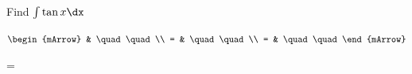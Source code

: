 \clearpage\noindent%
\begin{mtask}
   \task \begin{exercise} Find $\int \tan x \dx$
           \begin{envSolution}
             $\begin{mArrow}
                   & \quad \quad              \\
		   		 = & \quad \quad              \\
				 = & \quad \quad 
              \end{mArrow}$
            \begin{shortsolution}  
			     =$ \quad \quad \quad \quad$
			\end{shortsolution}				 
           \end{envSolution}
         \end{exercise}



\end{mtask}


